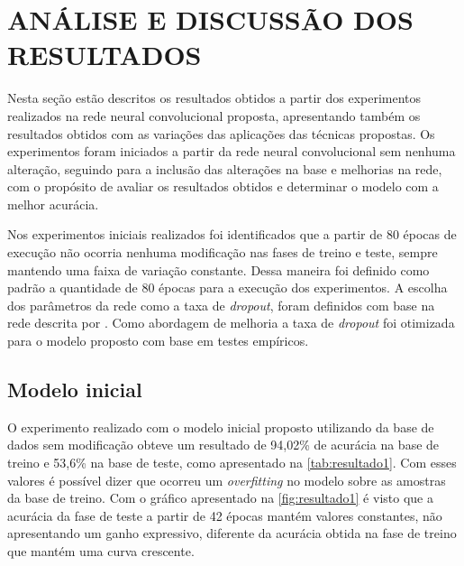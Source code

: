 
\chapter{ANÁLISE E DISCUSSÃO DOS RESULTADOS}

\label{chap:resultados}

Nesta seção estão descritos os resultados obtidos a partir dos experimentos realizados na rede neural convolucional proposta, apresentando também os resultados obtidos com as variações das aplicações das técnicas propostas.
 Os experimentos foram iniciados a partir da rede neural convolucional sem nenhuma alteração, seguindo para a inclusão das alterações na base e melhorias na rede, com o propósito de avaliar os resultados obtidos e determinar o modelo com a melhor acurácia.


\par Nos experimentos iniciais realizados foi identificados que a partir de 80 épocas de execução não ocorria nenhuma modificação nas fases de treino e teste, sempre mantendo uma faixa de variação constante. Dessa maneira foi definido como padrão a quantidade de 80 épocas para a execução dos experimentos. A escolha dos parâmetros da rede como a taxa de \textit{dropout}, foram definidos com base na rede descrita por . Como abordagem de melhoria a taxa de \textit{dropout} foi otimizada para o modelo proposto com base em testes empíricos.


\section{Modelo inicial}
O experimento realizado com o modelo inicial proposto utilizando da base de dados sem modificação obteve um resultado de 94,02\% de acurácia na base de treino e 53,6\% na base de teste, como apresentado na \autoref{tab:resultado1}. Com esses valores é possível dizer que ocorreu um \textit{overfitting} no modelo sobre as amostras da base de treino. Com o gráfico apresentado na \autoref{fig:resultado1} é visto que a acurácia da fase de teste a partir de 42 épocas mantém valores constantes, não apresentando um ganho expressivo, diferente da acurácia obtida na fase de treino que mantém uma curva crescente.

